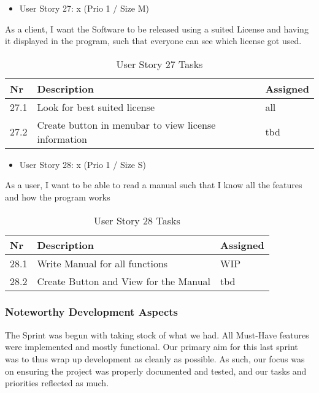 \begin{itemize}
	\item User Story 27: x (Prio 1 / Size M)
	\end{itemize}
As a client,
I want the Software to be released using a suited License and having it displayed in the program,
such that everyone can see which license got used.	
\begin{table}[h]
  \caption{User Story 27 Tasks}
  \label{Story 23 Tasks}
  \centering
  \begin{tabular}{p{1cm}|p{5cm}|p{3cm}|}
  	Nr & Description & Assigned \\ 
  	\hline
  	27.1 & Look for best suited license & all \\ 
  	\hline
  	27.2 & Create button in menubar to view license information & tbd \\ 
  	\hline
  \end{tabular}
\end{table}

\newpage
\begin{itemize}
	\item User Story 28: x (Prio 1 / Size S)
	\end{itemize}
As a user,
I want to be able to read a manual
such that I know all the features and how the program works
\begin{table}[h]
  \caption{User Story 28 Tasks}
  \label{Story 28 Tasks}
  \centering
  \begin{tabular}{p{1cm}|p{5cm}|p{3cm}|}
  	Nr & Description & Assigned \\ 
  	\hline
  	28.1 & Write Manual for all functions & WIP \\ 
  	\hline
  	28.2 & Create Button and View for the Manual & tbd \\ 
  	\hline
  \end{tabular}
\end{table}

\subsubsection*{Noteworthy Development Aspects}

The Sprint was begun with taking stock of what we had. All Must-Have features were implemented and mostly functional.
Our primary aim for this last sprint was to thus wrap up development as cleanly as possible. 
As such, our focus was on ensuring the project was properly documented and tested, and our tasks and priorities reflected as much. 

